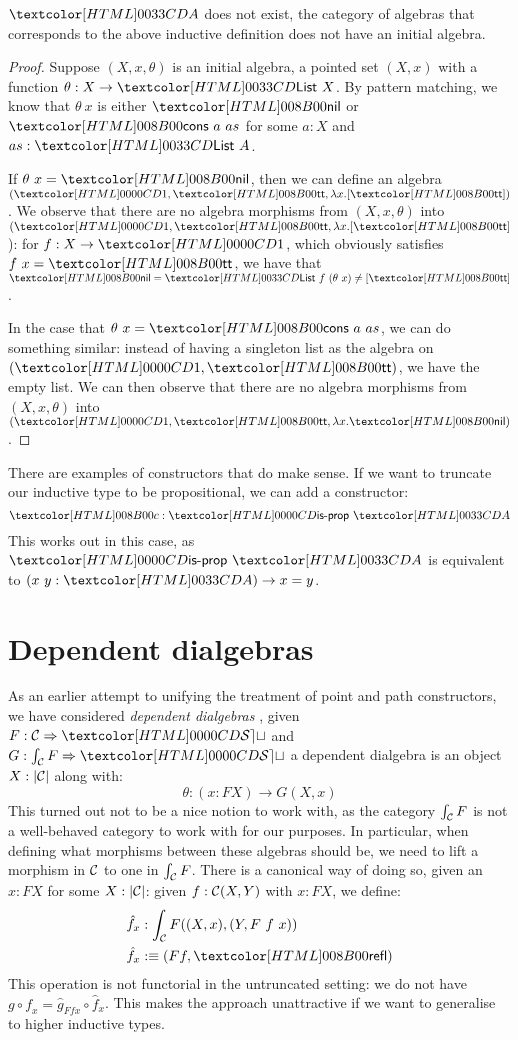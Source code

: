 \begin{proposition}
  $\Aty$ does not exist, \ie the category of algebras that corresponds
  to the above inductive definition does not have an initial algebra.
\end{proposition}

\begin{proof}
  Suppose $(X,x,\theta)$ is an initial algebra, \ie a pointed set
  $(X,x)$ with a function $\theta : X \to \List\ X$. By pattern
  matching, we know that $\theta\ x$ is either $\listnil$ or
  $\listcons\ a\ as$ for some $a : X$ and $as : \List\ A$.

  If $\theta\ x = \listnil$, then we can define an algebra
  $(\unitty, \unitval, \lambda x . [ \unitval ])$. We observe that there are no
  algebra morphisms from $(X,x,\theta)$ into
  $(\unitty, \unitval, \lambda x . [ \unitval ]$): for $f : X \to \unitty$, which
  obviously satisfies $f\ x = \unitval$, we have that
  $\listnil = \List\ f\ (\theta\ x) \neq [ \unitval ]$.

  In the case that $\theta\ x = \listcons\ a\ as$, we can do something
  similar: instead of having a singleton list as the algebra on
  $(\unitty, \unitval)$, we have the empty list. We can then observe
  that there are no algebra morphisms from $(X,x,\theta)$ into
  $(\unitty, \unitval, \lambda x . \listnil)$.
\end{proof}

There are examples of constructors that do make sense. If we want to
truncate our inductive type to be propositional, we can add a
constructor:
$$
\Ac : \isprop\ \Aty
$$
This works out in this case, as $\isprop\ \Aty$ is equivalent to
$(x\ y : \Aty) \to x = y$. 

\section{Dependent dialgebras}

As an earlier attempt to unifying the treatment of point and path
constructors, we have considered \emph{dependent dialgebras}
\cite{Altenkirch2015ii}, \ie given $F : \Func{\Cc}{\SET}$ and
$G : \Func{\int_{\Cc} F}{\SET}$ a dependent dialgebra is an object
$X : | \mathcal{C} |$ along with:
$$
\theta : (x : FX) \to G (X , x)
$$
This turned out not to be a nice notion to work with, as the category
$\int_{\mathcal{C}} F$ is not a well-behaved category to work with for our
purposes. In particular, when defining what morphisms between these
algebras should be, we need to lift a morphism in $\mathcal{C}$ to one in
$\int_{\mathcal{C}} F$. There is a canonical way of doing so, given an
$x : FX$ for some $X : | \mathcal{C} |$: given $f : \mathcal{C}(X,Y)$ with $x : FX$,
we define:
%
\begin{align*}
  &\hat{f}_x : \int_{\Cc} F ((X,x),(Y,F\ f\ x)) \\
  &\hat{f}_x \ddefeq (Ff , \refl)
\end{align*}
%
This operation is not functorial in the untruncated setting: we do not
have $\widehat{g \circ f}_x = \hat{g}_{F f x} \circ \hat{f}_x$. This
makes the approach unattractive if we want to generalise to higher
inductive types.

